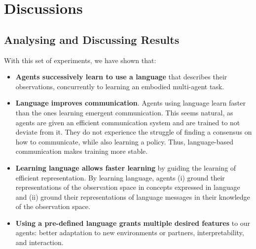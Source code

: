
\section{Discussions}

\subsection{Analysing and Discussing Results}\label{sec:LAMAC:Discuss_Results}

With this set of experiments, we have shown that:
\begin{itemize}
    \item \textbf{Agents successively learn to use a language} that describes their observations, concurrently to learning an embodied multi-agent task. 
    \item \textbf{Language improves communication}. Agents using language learn faster than the ones learning emergent communication. This seems natural, as agents are given an efficient communication system and are trained to not deviate from it. They do not experience the struggle of finding a consensus on how to communicate, while also learning a policy. Thus, language-based communication makes training more stable. 
    \item \textbf{Learning language allows faster learning} by guiding the learning of efficient representation. By learning language, agents (i) ground their representations of the observation space in concepts expressed in language and (ii) ground their representations of language messages in their knowledge of the observation space.
    \item \textbf{Using a pre-defined language grants multiple desired features} to our agents: better adaptation to new environments or partners, interpretability, and interaction. 
\end{itemize}

